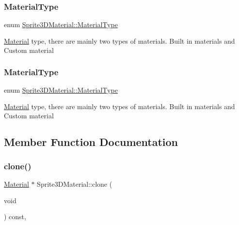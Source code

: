 \subsubsection{\texorpdfstring{Material\+Type}{MaterialType}\hspace{0.1cm}{\footnotesize\ttfamily [1/2]}}
{\footnotesize\ttfamily enum \hyperlink{classSprite3DMaterial_a2b3cb11be78a5f6332cc01d5b7063e32}{Sprite3\+D\+Material\+::\+Material\+Type}\hspace{0.3cm}{\ttfamily [strong]}}

\hyperlink{classMaterial}{Material} type, there are mainly two types of materials. Built in materials and Custom material \mbox{\label{classSprite3DMaterial_a2b3cb11be78a5f6332cc01d5b7063e32}} 
\subsubsection{\texorpdfstring{Material\+Type}{MaterialType}\hspace{0.1cm}{\footnotesize\ttfamily [2/2]}}
{\footnotesize\ttfamily enum \hyperlink{classSprite3DMaterial_a2b3cb11be78a5f6332cc01d5b7063e32}{Sprite3\+D\+Material\+::\+Material\+Type}\hspace{0.3cm}{\ttfamily [strong]}}

\hyperlink{classMaterial}{Material} type, there are mainly two types of materials. Built in materials and Custom material 

\subsection{Member Function Documentation}
\mbox{\label{classSprite3DMaterial_ac812fcb53172b407d4401d5242ce8d4e}} 
\subsubsection{\texorpdfstring{clone()}{clone()}\hspace{0.1cm}{\footnotesize\ttfamily [1/2]}}
{\footnotesize\ttfamily \hyperlink{classMaterial}{Material} $\ast$ Sprite3\+D\+Material\+::clone (\begin{DoxyParamCaption}\item[{void}]{ }\end{DoxyParamCaption}) const\hspace{0.3cm}{\ttfamily [override]}, {\ttfamily [virtual]}}

